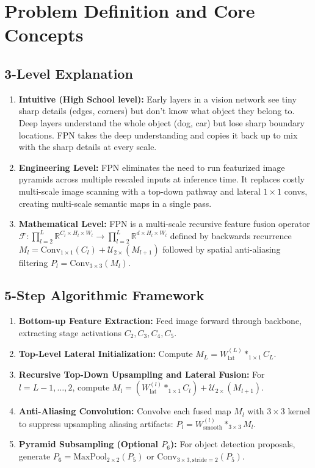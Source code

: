 \documentclass[11pt,a4paper]{article}
\theoremstyle{definition}
\begin{document}
\section{Problem Definition and Core Concepts}

\subsection{3-Level Explanation}
\begin{enumerate}
    \item \textbf{Intuitive (High School level):} Early layers in a vision network see tiny sharp details (edges, corners) but don't know what object they belong to. Deep layers understand the whole object (dog, car) but lose sharp boundary locations. FPN takes the deep understanding and copies it back up to mix with the sharp details at every scale.
    \item \textbf{Engineering Level:} FPN eliminates the need to run featurized image pyramids across multiple rescaled inputs at inference time. It replaces costly multi-scale image scanning with a top-down pathway and lateral $1 \times 1$ convs, creating multi-scale semantic maps in a single pass.
    \item \textbf{Mathematical Level:} FPN is a multi-scale recursive feature fusion operator $\mathcal{F}: \prod_{l=2}^L \mathbb{R}^{C_l \times H_l \times W_l} \to \prod_{l=2}^L \mathbb{R}^{d \times H_l \times W_l}$ defined by backwards recurrence $M_l = \text{Conv}_{1 \times 1}(C_l) + \mathcal{U}_{2\times}(M_{l+1})$ followed by spatial anti-aliasing filtering $P_l = \text{Conv}_{3 \times 3}(M_l)$.
\end{enumerate}

\subsection{5-Step Algorithmic Framework}
\begin{enumerate}
    \item \textbf{Bottom-up Feature Extraction:} Feed image forward through backbone, extracting stage activations $C_2, C_3, C_4, C_5$.
    \item \textbf{Top-Level Lateral Initialization:} Compute $M_L = W_{\text{lat}}^{(L)} *_{1 \times 1} C_L$.
    \item \textbf{Recursive Top-Down Upsampling and Lateral Fusion:} For $l = L-1, \dots, 2$, compute $M_l = (W_{\text{lat}}^{(l)} *_{1 \times 1} C_l) + \mathcal{U}_{2\times}(M_{l+1})$.
    \item \textbf{Anti-Aliasing Convolution:} Convolve each fused map $M_l$ with $3 \times 3$ kernel to suppress upsampling aliasing artifacts: $P_l = W_{\text{smooth}}^{(l)} *_{3 \times 3} M_l$.
    \item \textbf{Pyramid Subsampling (Optional $P_6$):} For object detection proposals, generate $P_6 = \text{MaxPool}_{2 \times 2}(P_5)$ or $\text{Conv}_{3\times 3, \text{stride}=2}(P_5)$.
\end{enumerate}
\end{document}
